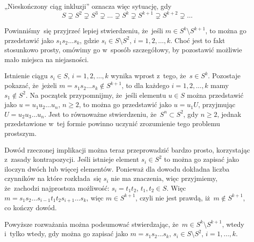 \documentclass[a4paper,11pt]{article}
\begin{document}
„Nieskończony ciąg inkluzji” oznacza więc sytuację, gdy
\begin{equation}
  \label{eq:Forys-Forys-52}
  S \supsetneq S^{ 2 } \supsetneq S^{ 3 } \supsetneq \ldots \supsetneq S^{ k } \supsetneq S^{ k + 1 } \supsetneq S^{ k + 2 } \supsetneq \ldots
\end{equation}

\vspace{\spaceFour}





\start {} Powinniśmy~się przyjrzeć lepiej stwierdzeniu, że~jeśli
$m \in S^{ k } \setminus S^{ k + 1 }$, to można go przedstawić jako
$s_{ 1 } s_{ 2 } \ldots s_{ k }$, gdzie
$s_{ i } \in S \setminus S^{ 2 }$, $i = 1, 2, \ldots, k$. Choć jest to fakt
stosunkowo prosty, omówimy go w~sposób szczegółowy, by pozostawić
możliwie mało miejsca na niejasności.

Istnienie ciągu $s_{ i } \in S$, $i = 1, 2, \ldots, k$ wynika wprost z~tego,
że~$s \in S^{ k }$. Pozostaje pokazać, że~jeżeli
$m = s_{ 1 } s_{ 2 } \ldots s_{ k } \notin S^{ k + 1 }$, to dla każdego
$i = 1, 2, \ldots, k$ mamy $s_{ 1 } \notin S^{ 2 }$. Na początek
przypomnijmy, że~jeśli elementu $u \in S$ można przedstawić jako
$u = u_{ 1 } u_{ 2 } \ldots u_{ n }$, $n \geq 2$, to można go przedstawić
jako $u = u_{ 1 } U$, przyjmując $U = u_{ 2 } u_{ 3 } \ldots u_{ n }$. Jest
to równoważne stwierdzeniu, że~$S^{ n } \subset S^{ 2 }$, gdy
$n \geq 2$, jednak przedstawione w~tej formie powinno uczynić
zrozumienie tego problemu prostszym.

Dowód rzeczonej implikacji można teraz przeprowadzić bardzo prosto,
korzystając z~zasady kontrapozycji. Jeśli istnieje element
$s_{ i } \in S^{ 2 }$ to można go zapisać jako iloczyn dwóch lub
więcej elementów. Ponieważ dla dowodu dokładna liczba czynników na
które rozkłada~się $s_{ i }$ nie ma znaczenia, więc przyjmiemy,
że~zachodzi najprostsza możliwość: $s_{ i } = t_{ 1 } t_{ 2 }$,
$t_{ 1 }, t_{ 2 } \in S$. Więc
$m = s_{ 1 } s_{ 2 } \ldots s_{ i - 1 } t_{ 1 } t_{ 2 } s_{ i + 1 } \ldots s_{ k
}$, więc $m \in S^{ k + 1 }$, czyli nie jest prawdą,
iż~$m \notin S^{ k + 1 }$, co kończy dowód.

Powyższe rozważania można podsumować stwierdzając,
że~$m \in S^{ k } \setminus S^{ k + 1 }$, wtedy i~tylko wtedy, gdy
można go zapisać jako $m = s_{ 1 } s_{ 2 } \ldots s_{ k }$,
$s_{ i } \in S \setminus S^{ 2 }$, $i = 1, \ldots, k$.

\vspace{\spaceFour}
\end{document}
